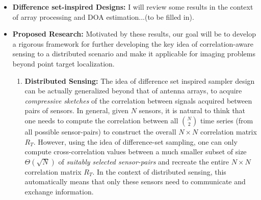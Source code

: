 \documentclass{article}
\begin{document}
\begin{itemize}
\item {\bf Difference set-inspired Designs:} I will review some results in the context of array processing and DOA estimation...(to be filled in).
\item {\bf Proposed Research:} Motivated by these results, our goal will be to develop a rigorous framework for further developing the key idea of correlation-aware sensing to a distributed scenario and make it applicable for imaging problems beyond point target localization.
\begin{enumerate}
\item {\bf Distributed Sensing:} The idea of difference set inspired sampler design can be actually generalized beyond that of antenna arrays, to acquire {\em compressive sketches} of the correlation between signals acquired between pairs of sensors. In general, given $N$ sensors, it is natural to think that one needs to compute the correlation between all $N\choose 2$ time series (from all possible sensor-pairs) to construct the overall $N\times N$ correlation matrix $R_T$. However, using the idea of difference-set sampling, one can only compute  cross-correlation values between a much smaller subset of size $\Theta(\sqrt{N})$ of {\em suitably selected sensor-pairs} and recreate the entire $N\times N$ correlation matrix $R_T$. In the context of distributed sensing, this automatically means that only these sensors need to communicate and exchange information.


\end{enumerate}
\end{itemize}
\end{document}
